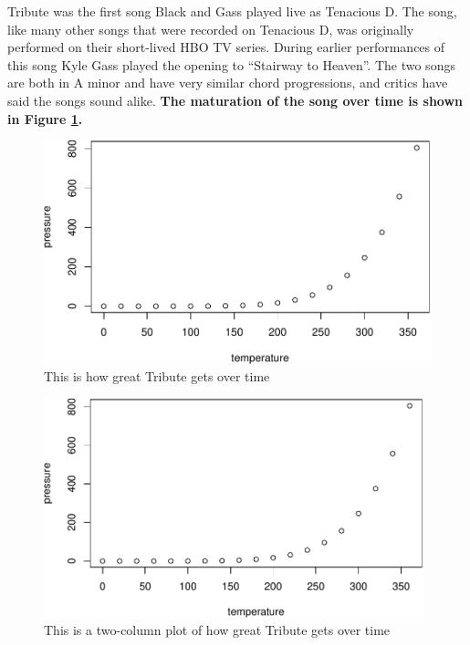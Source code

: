 \documentclass[sigchi]{acmart}
\begin{document}
Tribute was the first song Black and Gass played live as Tenacious D. The song, like many other songs that were recorded on Tenacious D, was originally performed on their short-lived HBO TV series. During earlier performances of this song Kyle Gass played the opening to ``Stairway to Heaven''. The two songs are both in A minor and have very similar chord progressions, and critics have said the songs sound alike.\citep{Cowan1988, Gluck2005, Wardak2002} \textbf{The maturation of the song over time is shown in Figure \ref{fig:tribute-plot}.}

\begin{figure}
\includegraphics[width=0.98\columnwidth]{step6_files/figure-latex/tribute-plot-1} \caption{This is how great Tribute gets over time}\label{fig:tribute-plot}
\end{figure}

\begin{figure}
\includegraphics[width=0.98\textwidth]{step6_files/figure-latex/two-col-tribute-plot-1} \caption{This is a two-column plot of how great Tribute gets over time}\label{fig:two-col-tribute-plot}
\end{figure}
\end{document}
